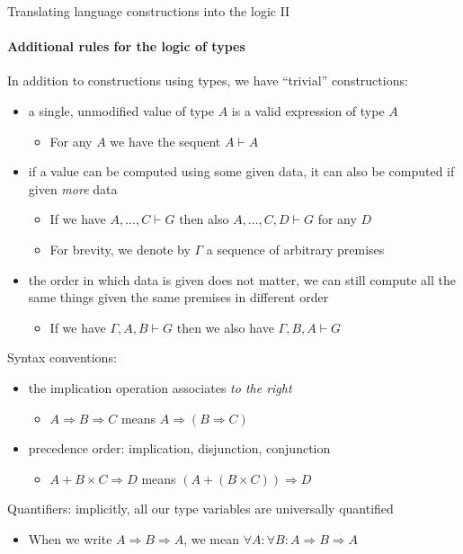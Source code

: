 \documentclass[english]{beamer}
\begin{document}
\begin{frame}{Translating language constructions into the logic II}


\framesubtitle{Additional rules for the logic of types}

In addition to constructions using types, we have ``trivial'' constructions:
\begin{itemize}
\item a single, unmodified value of type $A$ is a valid expression of type
$A$
\begin{itemize}
\item For any $A$ we have the sequent $A\vdash A$
\end{itemize}
\item if a value can be computed using some given data, it can also be computed
if given\emph{ more} data
\begin{itemize}
\item If we have $A,...,C\vdash G$ then also $A,...,C,D\vdash G$ for any
$D$
\item For brevity, we denote by $\Gamma$ a sequence of arbitrary premises
\end{itemize}
\item the order in which data is given does not matter, we can still compute
all the same things given the same premises in different order
\begin{itemize}
\item If we have $\Gamma,A,B\vdash G$ then we also have $\Gamma,B,A\vdash G$
\end{itemize}
\end{itemize}
Syntax conventions:
\begin{itemize}
\item the implication operation associates \emph{to the right}
\begin{itemize}
\item $A\Rightarrow B\Rightarrow C$ means $A\Rightarrow\left(B\Rightarrow C\right)$
\end{itemize}
\item precedence order: implication, disjunction, conjunction
\begin{itemize}
\item $A+B\times C\Rightarrow D$ means $\left(A+\left(B\times C\right)\right)\Rightarrow D$
\end{itemize}
\end{itemize}
Quantifiers: implicitly, all our type variables are universally quantified
\begin{itemize}
\item When we write $A\Rightarrow B\Rightarrow A$, we mean $\forall A:\forall B:A\Rightarrow B\Rightarrow A$
\end{itemize}
\end{frame}
\end{document}
